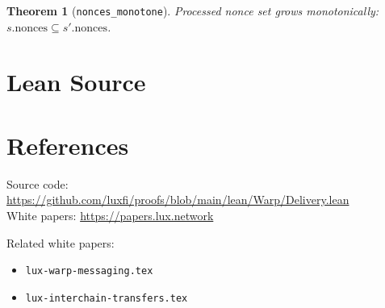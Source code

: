 \documentclass[11pt]{article}
\newtheorem{theorem}{Theorem}
\begin{document}
\begin{theorem}[\texttt{nonces\_monotone}]
Processed nonce set grows monotonically: $s.\text{nonces} \subseteq s'.\text{nonces}$.
\end{theorem}


\section{Lean Source}


\section{References}
\noindent Source code: \url{https://github.com/luxfi/proofs/blob/main/lean/Warp/Delivery.lean}\\
\noindent White papers: \url{https://papers.lux.network}

\noindent Related white papers:
\begin{itemize}
  \item \texttt{lux-warp-messaging.tex}
  \item \texttt{lux-interchain-transfers.tex}
\end{itemize}
\end{document}
